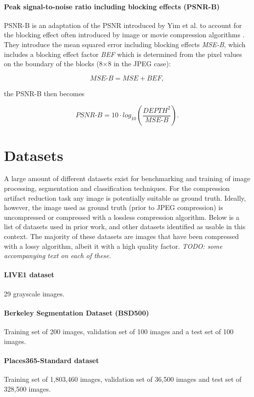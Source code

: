 \paragraph{Peak signal-to-noise ratio including blocking effects (PSNR-B)}
PSNR-B is an adaptation of the PSNR introduced by Yim et al. to account for the blocking effect often introduced by image or movie compression algorithms \cite{yim2011qualitypsnrb}. They introduce the mean squared error including blocking effects \textit{MSE-B}, which includes a blocking effect factor \textit{BEF} which is determined from the pixel values on the boundary of the blocks (8$\times$8 in the JPEG case):

$$
\textit{MSE-B} = \textit{MSE} + \textit{BEF},
$$

the PSNR-B then becomes

$$
\textit{PSNR-B} = 10 \cdot \textit{log}_{10}(\frac{\textit{DEPTH}^2}{\textit{MSE-B}}).
$$

\section{Datasets}
A large amount of different datasets exist for benchmarking and training of image processing, segmentation and classification techniques. For the compression artifact reduction task any image is potentially suitable as ground truth. Ideally, however, the image used as ground truth (prior to JPEG compression) is uncompressed or compressed with a lossless compression algorithm. Below is a list of datasets used in prior work, and other datasets identified as usable in this context. The majority of these datasets are images that have been compressed with a lossy algorithm, albeit it with a high quality factor. \textit{TODO: some accompanying text on each of these.}

\paragraph{LIVE1 dataset \cite{liveDatabase}} 29 grayscale images.

\paragraph{Berkeley Segmentation Dataset (BSD500) \cite{bsd500}} Training set of 200 images, validation set of 100 images and a test set of 100 images. 

\paragraph{Places365-Standard dataset \cite{places2}} Training set of 1,803,460 images, validation set of 36,500 images and test set of 328,500 images.

